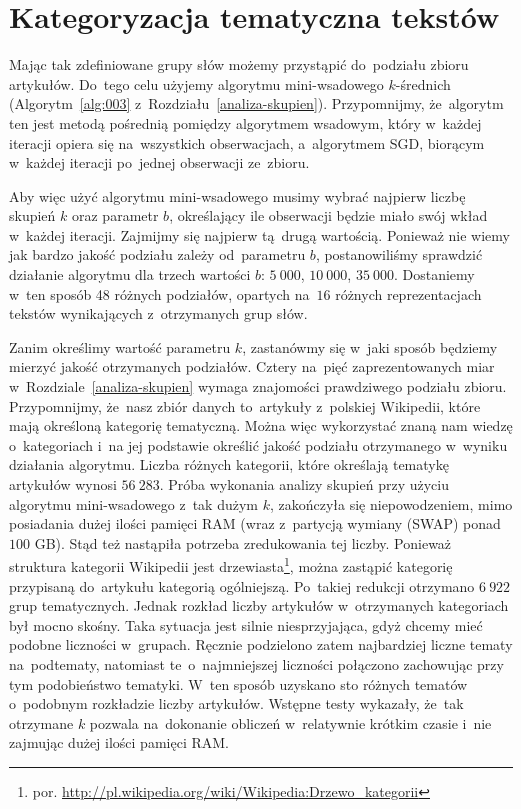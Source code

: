 \documentclass{praca1}
\begin{document}
\section{Kategoryzacja tematyczna tekstów}

Mając tak zdefiniowane grupy słów możemy przystąpić do~podziału zbioru artykułów. Do~tego celu użyjemy algorytmu mini-wsadowego $k$-średnich (Algorytm~\ref{alg:003} z~Rozdziału~\ref{analiza-skupien}). Przypomnijmy, że~algorytm ten jest metodą pośrednią pomiędzy algorytmem wsadowym, który w~każdej iteracji opiera się na~wszystkich obserwacjach, a~algorytmem SGD, biorącym w~każdej iteracji po~jednej obserwacji ze~zbioru. 

Aby więc użyć algorytmu mini-wsadowego musimy wybrać najpierw liczbę skupień $k$ oraz parametr $b$, określający ile obserwacji będzie miało swój wkład w~każdej iteracji. Zajmijmy się najpierw tą~drugą wartością. Ponieważ nie wiemy jak bardzo jakość podziału zależy od~parametru $b$, postanowiliśmy sprawdzić działanie algorytmu dla trzech wartości $b$: $5\ 000$, $10\ 000$, $35\ 000$. Dostaniemy w~ten sposób 48 różnych podziałów, opartych na~$16$ różnych reprezentacjach tekstów wynikających z~otrzymanych grup słów.

Zanim określimy wartość parametru $k$, zastanówmy się w~jaki sposób będziemy mierzyć jakość otrzymanych podziałów. Cztery na~pięć zaprezentowanych miar w~Rozdziale~\ref{analiza-skupien} wymaga znajomości prawdziwego podziału zbioru. Przypomnijmy, że~nasz zbiór danych to~artykuły z~polskiej Wikipedii, które mają określoną kategorię tematyczną. Można więc wykorzystać znaną nam wiedzę o~kategoriach i~na jej podstawie określić jakość podziału otrzymanego w~wyniku działania algorytmu. Liczba różnych kategorii, które określają tematykę artykułów wynosi $56\ 283$. Próba wykonania analizy skupień przy użyciu algorytmu mini-wsadowego z~tak dużym $k$, zakończyła się niepowodzeniem, mimo posiadania dużej ilości pamięci RAM (wraz z~partycją wymiany (SWAP) ponad $100$ GB). Stąd też nastąpiła potrzeba zredukowania tej liczby. Ponieważ struktura kategorii Wikipedii jest drzewiasta\footnote{por. \url{http://pl.wikipedia.org/wiki/Wikipedia:Drzewo_kategorii}}, można zastąpić kategorię przypisaną do~artykułu kategorią ogólniejszą. Po~takiej redukcji otrzymano $6\ 922$ grup tematycznych. Jednak rozkład liczby artykułów w~otrzymanych kategoriach był mocno skośny. Taka sytuacja jest silnie niesprzyjająca, gdyż chcemy mieć podobne liczności w~grupach. Ręcznie podzielono zatem najbardziej liczne tematy na~podtematy, natomiast te~o~najmniejszej liczności połączono zachowując przy tym podobieństwo tematyki. W~ten sposób uzyskano sto różnych tematów o~podobnym rozkładzie liczby artykułów. Wstępne testy wykazały, że~tak otrzymane $k$ pozwala na~dokonanie obliczeń w~relatywnie krótkim czasie i~nie zajmując dużej ilości pamięci RAM.
\end{document}
